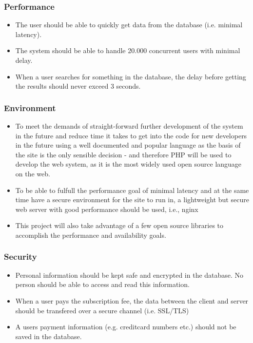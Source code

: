 \subsubsection*{Performance}
\begin{itemize}
\item The user should be able to quickly get data from the database (i.e. minimal latency).
\item The system should be able to handle 20.000 concurrent users with minimal delay.
\item When a user searches for something in the database, the delay before getting the results should never exceed 3 seconds.
\end{itemize}

\subsubsection*{Environment}
\begin{itemize}
\item To meet the demands of straight-forward further development of the system in the future and reduce time it takes to get into the code for new developers in the future using a well documented and popular language as the basis of the site is the only sensible decision - and therefore PHP will be used to develop the web system, as it is the most widely used open source language on the web. 
\item To be able to fulfull the performance goal of minimal latency and at the same time have a secure environment for the site to run in, a lightweight but secure web server with good performance should be used, i.e., nginx 
\item This project will also take advantage of a few open source libraries to accomplish the performance and availability goals.
\end{itemize}

\subsubsection*{Security}
\begin{itemize}
\item Personal information should be kept safe and encrypted in the database. No person should be able to access and read this information.
\item When a user pays the subscription fee, the data between the client and server should be transfered over a secure channel (i.e. SSL/TLS)
\item A users payment information (e.g. creditcard numbers etc.) should not be saved in the database.
\end{itemize}